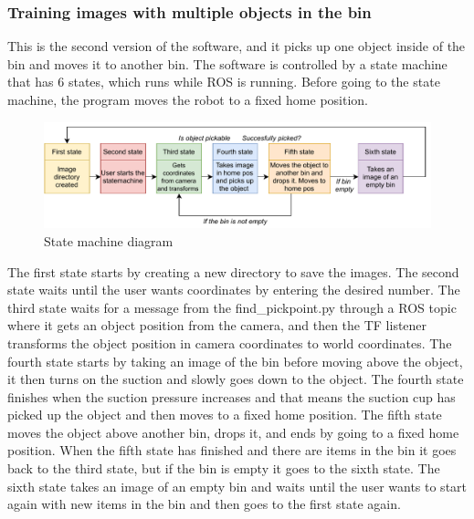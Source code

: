 \subsubsection{Training images with multiple objects in the bin}
This is the second version of the software, and it picks up one object inside of the bin and moves it to another bin.
The software is controlled by a state machine that has 6 states, which runs while ROS is running. Before going to the state machine, the program moves the robot to a fixed home position. 

\begin{figure}[h]
 \centering
 \includegraphics[width=\textwidth]{graphics/statemachine.pdf}
 \caption{State machine diagram}
 \label{fig:statemachine}
\end{figure}

The first state starts by creating a new directory to save the images. 
The second state waits until the user wants coordinates by entering the desired number. 
The third state waits for a message from the find\_pickpoint.py through a ROS topic where it gets an object position from the camera, and then the TF listener transforms the object position in camera coordinates to world coordinates.
The fourth state starts by taking an image of the bin before moving above the object, it then turns on the suction and slowly goes down to the object. The fourth state finishes when the suction pressure increases and that means the suction cup has picked up the object and then moves to a fixed home position.
The fifth state moves the object above another bin, drops it, and ends by going to a fixed home position. When the fifth state has finished and there are items in the bin it goes back to the third state, but if the bin is empty it goes to the sixth state.
The sixth state takes an image of an empty bin and waits until the user wants to start again with new items in the bin and then goes to the first state again. 


